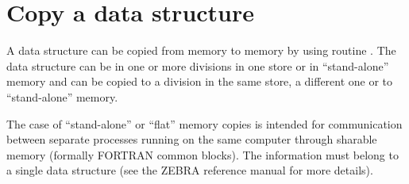 \section{Copy a data structure}
\par A data structure can be copied from memory to memory by using
routine . The data structure can be in one or more divisions
in one store or in ``stand-alone'' memory and can be copied to a division
in the same store, a different one or to ``stand-alone'' memory.
\par The case of ``stand-alone'' or ``flat''
memory copies is intended for communication
between separate processes running on the same computer through sharable
memory (formally FORTRAN common blocks). The information must belong to
a single data structure
(see the ZEBRA reference manual for more details).
\Idesc
